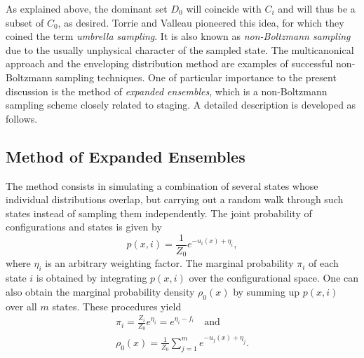 \documentclass[aip,jcp,reprint,amsmath,amssymb]{revtex4-1}
\begin{document}
As explained above, the dominant set $D_0$ will coincide with $C_i$ and will thus be a subset of $C_0$, as desired. Torrie and Valleau\cite{Torrie_1977} pioneered this idea, for which they coined the term \textit{umbrella sampling}. It is also known as \textit{non-Boltzmann sampling} due to the usually unphysical character of the sampled state. The multicanonical approach\cite{Berg_1992, Lee_1993, Abreu_2006} and the enveloping distribution method\cite{Christ_2007, Christ_2008, Christ_2009} are examples of successful non-Boltzmann sampling techniques. One of particular importance to the present discussion is the method of \textit{expanded ensembles},\cite{Lyubartsev_1992} which is a non-Boltzmann sampling scheme closely related to staging. A detailed description is developed as follows.

\subsection{Method of Expanded Ensembles}

The method consists in simulating a combination of several states whose individual distributions overlap, but carrying out a random walk through such states instead of sampling them independently. The joint probability of configurations and states is given by\cite{Nymeyer_2010}
\begin{equation}
\label{eq:expanded ensemble joint}
p(x, i) = \frac{1}{Z_0} e^{-u_i(x) + \eta_i},
\end{equation}
where $\eta_i$ is an arbitrary weighting factor. The marginal probability $\pi_i$ of each state $i$ is obtained by integrating $p(x,i)$ over the configurational space. One can also obtain the marginal probability density $\rho_0(x)$ by summing up $p(x,i)$ over all $m$ states. These procedures yield
\begin{align}
\pi_i = \frac{Z_i}{Z_0} e^{\eta_i} = e^{\eta_i - f_i} \quad \text{and} \label{eq:expanded ensemble prior} \\
\rho_0(x) = \frac{1}{Z_0} \sum_{j=1}^m e^{-u_j(x) + \eta_j}. \label{eq:expanded ensemble evidence}
\end{align}
\end{document}

